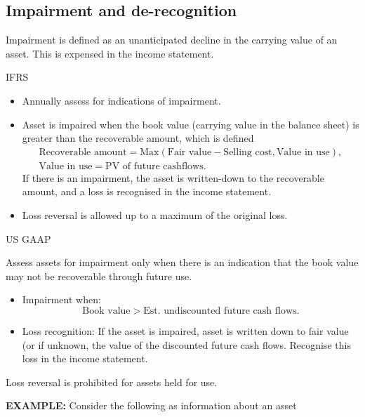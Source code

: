 \documentclass[../notes_compiled.tex]{subfiles}
\begin{document}
\subsection{Impairment and de-recognition}
\begin{itemize}
\item Impairment is defined as an unanticipated decline in the carrying value of an asset. This is expensed in the income statement.
\item IFRS
\begin{itemize}
\item Annually assess for indications of impairment.
\item Asset is impaired when the book value (carrying value in the balance sheet) is greater than the recoverable amount, which is defined
\begin{gather}
\text{Recoverable amount} = \text{Max}(\text{Fair value} - \text{Selling cost}, \text{Value in use}), \\
\text{Value in use} = \text{PV of future cashflows}.
\end{gather}
If there is an impairment, the asset is written-down to the recoverable amount, and a loss is recognised in the income statement.
\item Loss reversal is allowed up to a maximum of the original loss.
\end{itemize}

\item{US GAAP}
\begin{itemize}
\item Assess assets for impairment only when there is an indication that the book value may not be recoverable through future use.
\begin{itemize}
\item Impairment when: 
\begin{equation*}
\text{Book value} > \text{Est. undiscounted future cash flows}.
\end{equation*}
\item Loss recognition: If the asset is impaired, asset is written down to fair value (or if unknown, the value of the discounted future cash flows. Recognise this loss in the income statement.
\end{itemize}
\item Loss reversal is prohibited for assets held for use.

{\color{RedViolet}
\item[] \textbf{EXAMPLE:} Consider the following as information about an asset

}
\end{itemize}
\end{itemize}
\end{document}
